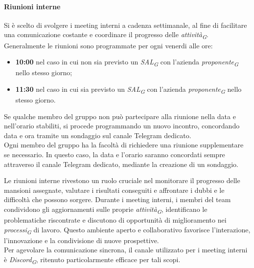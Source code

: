 \paragraph{Riunioni interne}
Si è scelto di svolgere i meeting interni a cadenza settimanale, al fine di facilitare una comunicazione costante e coordinare il progresso delle \textit{attività}\textsubscript{\textit{G}}. \\

Generalmente le riunioni sono programmate per ogni venerdi alle ore:
\begin{itemize}
    \item \textbf{10:00} nel caso in cui non sia previsto un \textit{SAL}\textsubscript{\textit{G}} con l'azienda \textit{proponente}\textsubscript{\textit{G}} nello stesso giorno;
    \item \textbf{11:30} nel caso in cui sia previsto un \textit{SAL}\textsubscript{\textit{G}} con l'azienda \textit{proponente}\textsubscript{\textit{G}} nello stesso giorno.
\end{itemize}
Se qualche membro del gruppo non può partecipare alla riunione nella data e nell'orario stabiliti, si procede programmando un nuovo incontro, concordando data e ora tramite un sondaggio sul canale Telegram dedicato. \\
Ogni membro del gruppo ha la facoltà di richiedere una riunione supplementare se necessario. In questo caso, la data e l'orario saranno concordati sempre attraverso il canale Telegram dedicato, mediante la creazione di un sondaggio.

Le riunioni interne rivestono un ruolo cruciale nel monitorare il progresso delle mansioni assegnate, valutare i risultati conseguiti e affrontare i dubbi e le difficoltà che possono sorgere. Durante i meeting interni, i membri del team condividono gli aggiornamenti sulle proprie \textit{attività}\textsubscript{\textit{G}}, identificano le problematiche riscontrate e discutono di opportunità di miglioramento nei \textit{processi}\textsubscript{\textit{G}} di lavoro. Questo ambiente aperto e collaborativo favorisce l'interazione, l'innovazione e la condivisione di nuove prospettive.\\

Per agevolare la comunicazione sincrona, il canale utilizzato per i meeting interni è \textit{Discord}\textsubscript{\textit{G}}, ritenuto particolarmente efficace per tali scopi.

\vspace{0,1cm}

